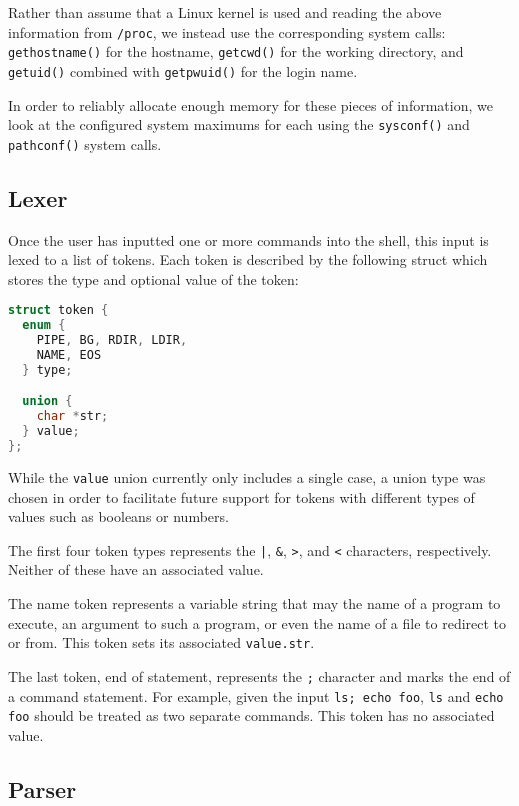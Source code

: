 Rather than assume that a Linux kernel is used and reading the above information from \texttt{/proc}, we instead use the corresponding system calls: \texttt{gethostname()} for the hostname, \texttt{getcwd()} for the working directory, and \texttt{getuid()} combined with \texttt{getpwuid()} for the login name.

In order to reliably allocate enough memory for these pieces of information, we look at the configured system maximums for each using the \texttt{sysconf()} and \texttt{pathconf()} system calls.

\subsection{Lexer}

Once the user has inputted one or more commands into the shell, this input is lexed to a list of tokens. Each token is described by the following struct which stores the type and optional value of the token:

\begin{lstlisting}[language=C]
struct token {
  enum {
    PIPE, BG, RDIR, LDIR,
    NAME, EOS
  } type;

  union {
    char *str;
  } value;
};
\end{lstlisting}

While the \texttt{value} union currently only includes a single case, a union type was chosen in order to facilitate future support for tokens with different types of values such as booleans or numbers.

The first four token types represents the \texttt{|}, \texttt{\&}, \texttt{>}, and \texttt{<} characters, respectively. Neither of these have an associated value.

The name token represents a variable string that may the name of a program to execute, an argument to such a program, or even the name of a file to redirect to or from. This token sets its associated \texttt{value.str}.

The last token, end of statement, represents the \texttt{;} character and marks the end of a command statement. For example, given the input \texttt{ls; echo foo}, \texttt{ls} and \texttt{echo foo} should be treated as two separate commands. This token has no associated value.

\subsection{Parser}

